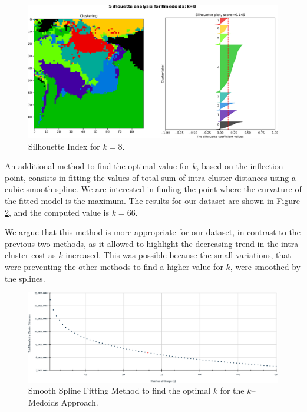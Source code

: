 \begin{figure}[h]
	\centering
	\includegraphics[scale=0.50]{../Figures/silhouette-kmedoids_k8_seed0_lite}
	\caption{Silhouette Index for $k=8$.}
	\label{Fig:Silhouette-kMedoids}
\end{figure}

An additional method to find the optimal value for $k$, based on the inflection point, consists in fitting the values of total sum of intra cluster distances using a cubic smooth spline. We are interested in finding the point where the curvature of the fitted model is the maximum. The results for our dataset are shown in Figure \ref{Fig:SmoothSpline-kMedoids}, and the computed value is $k = 66$.

We argue that this method is more appropriate for our dataset, in contrast to the previous two methods, as it allowed to highlight the decreasing trend in the intra-cluster cost as $k$ increased. This was possible because the small variations, that were preventing the other methods to find a higher value for $k$, were smoothed by the splines.

\begin{figure}[h]
	\centering
	\includegraphics[scale=0.5]{../Figures/SmoothSpline-kMedoids}
	\caption{Smooth Spline Fitting Method to find the optimal $k$ for the $k$--Medoids Approach.}
	\label{Fig:SmoothSpline-kMedoids}
\end{figure}


